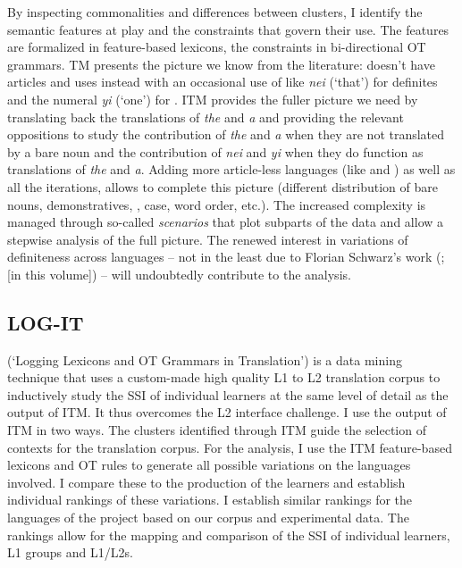 \documentclass[output=paper,
modfonts
]{langscibook}
\begin{document}
By inspecting commonalities and differences between clusters, I identify the semantic features at play and the constraints that govern their use. The features are formalized in feature-based lexicons, the constraints in bi-directional OT grammars. TM presents the picture we know from the literature:  doesn’t have articles and uses  instead with an occasional use of  like \textit{nei} (‘that’) for definites and the numeral \textit{yi} (‘one’) for . ITM provides the fuller picture we need by translating back the translations of \textit{the} and \textit{a} and providing the relevant oppositions to study the contribution of \textit{the} and \textit{a} when they are not translated by a bare noun and the contribution of \textit{nei} and \textit{yi} when they do function as translations of \textit{the} and \textit{a}. Adding more article-less languages (like  and ) as well as all the iterations, allows to complete this picture (different distribution of bare nouns, demonstratives, , case, word order, etc.). The increased complexity is managed through so-called \textit{scenarios} that plot subparts of the data and allow a stepwise analysis of the full picture. The renewed interest in variations of definiteness across languages -- not in the least due to Florian Schwarz’s work (\citealt{Schwarz2009}; \citealt{SchwarzToappear} [in this volume]) -- will undoubtedly contribute to the analysis.

\subsection{LOG-IT}

 (‘Logging Lexicons and OT Grammars in Translation’) is a data mining technique that uses a custom-made high quality L1 to L2 translation corpus to inductively study the SSI of individual learners at the same level of detail as the output of ITM. It thus overcomes the L2 interface challenge. 
I use the output of ITM in two ways. The clusters identified through ITM guide the selection of contexts for the translation corpus. For the analysis, I use the ITM feature-based lexicons and OT rules to generate all possible variations on the languages involved. I compare these to the production of the learners and establish individual rankings of these variations. I establish similar rankings for the languages of the project based on our corpus and experimental data. 
The rankings allow for the mapping and comparison of the SSI of individual learners, L1 groups and L1/L2s. 
\end{document}
